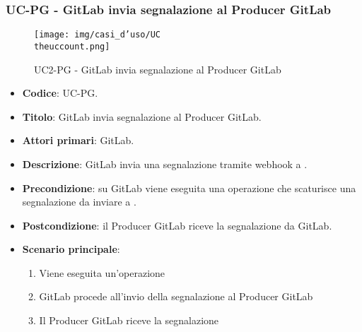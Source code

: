 \subsubsection{UC\theuccount-PG - GitLab invia segnalazione al Producer GitLab}
	\begin{figure}[H]
		\centering
		\texttt{[image: img/casi\_d'uso/UC\\theuccount.png]}\\
		\caption{UC2-PG - GitLab invia segnalazione al Producer GitLab}
	\end{figure}
\begin{itemize}
    \item \textbf{Codice}: UC\theuccount-PG.
    \item \textbf{Titolo}: GitLab invia segnalazione al Producer GitLab.
    \item \textbf{Attori primari}: GitLab.
    \item \textbf{Descrizione}: GitLab invia una segnalazione tramite webhook a \progetto.
    \item \textbf{Precondizione}: su GitLab viene eseguita una operazione che scaturisce una
    segnalazione da inviare a \progetto.
    \item \textbf{Postcondizione}: il Producer GitLab riceve la segnalazione da GitLab.
    \item \textbf{Scenario principale}:
    \begin{enumerate}
        \item Viene eseguita un'operazione
        \item GitLab procede all'invio della segnalazione al Producer GitLab
        \item Il Producer GitLab riceve la segnalazione
    \end{enumerate}

\end{itemize}


